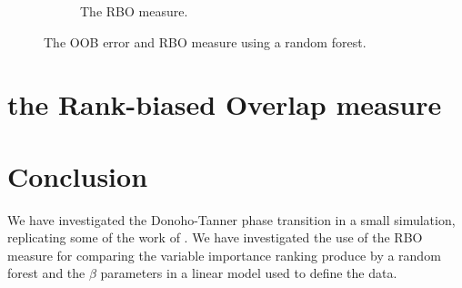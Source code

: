 \documentclass[11pt]{article}
\begin{document}
\begin{figure}[tbhp]
\begin{subfigure}[t]{0.5\linewidth}
    \caption{The RBO measure.}
    \label{figure:ranger_rbo_Stodden_simulation.png}
  \end{subfigure} 
  \caption{The  OOB error and RBO measure using a random forest.}
  \label{figure:ranger_error_and_rbo_Stodden_simulation.png}
\end{figure}

\section{the Rank-biased Overlap measure
\label{section:the.Rank.biased.Overlap.measure}}
\cite{Webber2010}
\cite{gespeR.2015} 


\section{Conclusion}
We have investigated the Donoho-Tanner phase transition in a small simulation, replicating some of the work of
\cite{Donoho.and.Stodden.2006}. We have investigated the use of the RBO measure for comparing the variable importance
ranking produce by a random forest and the $\beta$ parameters in a linear model used to define the data.




\end{document}
